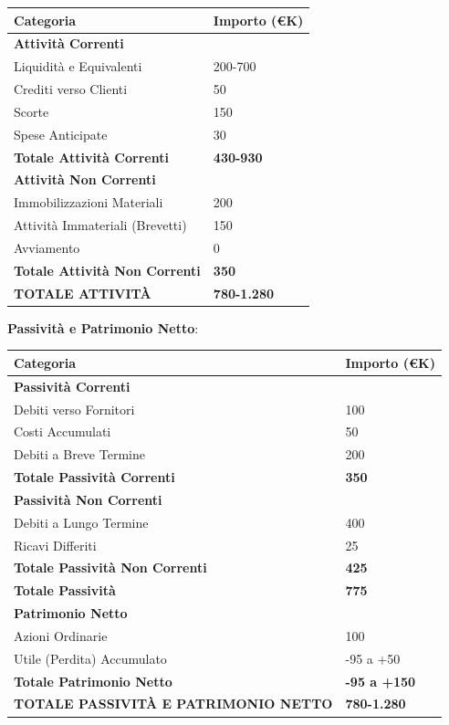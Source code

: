 \documentclass[11pt,a4paper]{report}
\begin{document}
\begin{longtable}{|p{4cm}|p{2cm}|}
\hline
\textbf{Categoria} & \textbf{Importo (€K)} \\ \hline
\textbf{Attività Correnti} & \\ \hline
Liquidità e Equivalenti & 200-700 \\ \hline
Crediti verso Clienti & 50 \\ \hline
Scorte & 150 \\ \hline
Spese Anticipate & 30 \\ \hline
\textbf{Totale Attività Correnti} & \textbf{430-930} \\ \hline
\textbf{Attività Non Correnti} & \\ \hline
Immobilizzazioni Materiali & 200 \\ \hline
Attività Immateriali (Brevetti) & 150 \\ \hline
Avviamento & 0 \\ \hline
\textbf{Totale Attività Non Correnti} & \textbf{350} \\ \hline
\textbf{TOTALE ATTIVITÀ} & \textbf{780-1.280} \\ \hline
\end{longtable}

\textbf{Passività e Patrimonio Netto}:

\begin{longtable}{|p{4cm}|p{2cm}|}
\hline
\textbf{Categoria} & \textbf{Importo (€K)} \\ \hline
\textbf{Passività Correnti} & \\ \hline
Debiti verso Fornitori & 100 \\ \hline
Costi Accumulati & 50 \\ \hline
Debiti a Breve Termine & 200 \\ \hline
\textbf{Totale Passività Correnti} & \textbf{350} \\ \hline
\textbf{Passività Non Correnti} & \\ \hline
Debiti a Lungo Termine & 400 \\ \hline
Ricavi Differiti & 25 \\ \hline
\textbf{Totale Passività Non Correnti} & \textbf{425} \\ \hline
\textbf{Totale Passività} & \textbf{775} \\ \hline
\textbf{Patrimonio Netto} & \\ \hline
Azioni Ordinarie & 100 \\ \hline
Utile (Perdita) Accumulato & -95 a +50 \\ \hline
\textbf{Totale Patrimonio Netto} & \textbf{-95 a +150} \\ \hline
\textbf{TOTALE PASSIVITÀ E PATRIMONIO NETTO} & \textbf{780-1.280} \\ \hline
\end{longtable}
\end{document}
